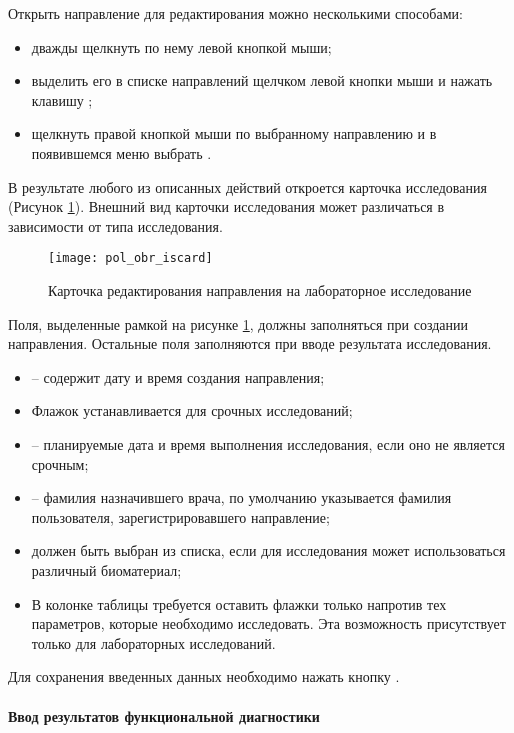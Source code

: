 Открыть направление для редактирования можно несколькими способами:
\begin{itemize}
 \item дважды щелкнуть по нему левой кнопкой мыши;
 \item выделить его в списке направлений щелчком левой кнопки мыши и нажать клавишу ;
 \item щелкнуть правой кнопкой мыши по выбранному направлению и в появившемся меню выбрать .
\end{itemize}

В результате любого из описанных действий откроется карточка исследования (Рисунок \ref{img_pol_obr_iscard}). Внешний вид карточки исследования может различаться в зависимости от типа исследования.

 \begin{figure}[ht]\centering
   \texttt{[image: pol\_obr\_iscard]}
   \caption{Карточка редактирования направления на лабораторное исследование}
   \label{img_pol_obr_iscard}
 \end{figure} 
 
Поля, выделенные рамкой на рисунке \ref{img_pol_obr_iscard}, должны заполняться при создании направления. Остальные поля заполняются при вводе результата исследования.
\begin{itemize}
 \item {} – содержит дату и время создания направления;
 \item Флажок  устанавливается для срочных исследований;
 \item {} – планируемые дата и время выполнения исследования, если оно не является срочным;
 \item {} – фамилия назначившего врача, по умолчанию указывается фамилия пользователя, зарегистрировавшего направление;
 \item {} должен быть выбран из списка, если для исследования может использоваться различный биоматериал;
 \item В колонке  таблицы требуется оставить флажки только напротив тех параметров, которые необходимо исследовать. Эта возможность присутствует только для лабораторных исследований.
\end{itemize}
 
Для сохранения введенных данных необходимо нажать кнопку .

\paragraph{Ввод результатов функциональной диагностики} \label{pol_obr_isrez}

